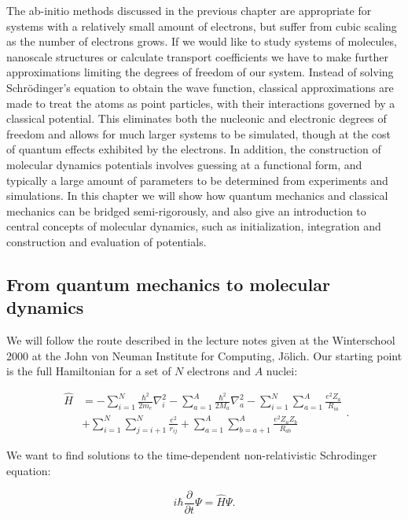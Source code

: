 The ab-initio methods discussed in the previous chapter
are appropriate for systems with a relatively small amount of electrons,
but suffer from cubic scaling as the number of electrons grows.
If we would like to study systems of molecules, nanoscale structures
or calculate transport coefficients we have to make further approximations
limiting the degrees of freedom of our system.
Instead of solving Schr\"{o}dinger's equation to obtain
the wave function, classical approximations are made to
treat the atoms as point particles, with their interactions
governed by a classical potential. This eliminates both the nucleonic
and electronic degrees of freedom and allows for much larger systems
to be simulated, though at the cost of quantum effects
exhibited by the electrons. In addition, the construction
of molecular dynamics potentials involves guessing at a functional
form, and typically a large amount of parameters to be determined
from experiments and simulations.
In this chapter we will show how quantum mechanics
and classical mechanics can be bridged semi-rigorously,
and also give an introduction to central concepts of molecular dynamics,
such as initialization, integration and construction and evaluation
of potentials.

\subsection{From quantum mechanics to molecular dynamics}
We will follow the route described in the lecture notes
\parencite[Marx, Dominik and Hutter, J\"{o}rg][pages 1-10]{marx2000}
given at the Winterschool 2000 at the John von Neuman Institute
for Computing, J\"{o}lich.
Our starting point is the full Hamiltonian 
for a set of $N$ electrons and $A$ nuclei:

\begin{equation}
    \begin{split}
        \hat{H}
        &= -\sum_{i=1}^N \frac{\hbar^2}{2m_e} \nabla_i^2
        -\sum_{a=1}^A \frac{\hbar^2}{2M_a} \nabla_a^2
        -\sum_{i=1}^N \sum_{a=1}^A \frac{e^2 Z_a}{R_{ia}} \\
        &+ \sum_{i=1}^N \sum_{j=i+1}^N \frac{e^2}{r_{ij}}
        + \sum_{a=1}^A \sum_{b=a+1}^A \frac{e^2 Z_a Z_b}{R_{ab}}
    \end{split} .
\end{equation}

We want to find solutions to the time-dependent non-relativistic
Schrodinger equation:

$$ i\hbar \frac{\partial}{\partial t} \Psi = \hat{H} \Psi . $$

